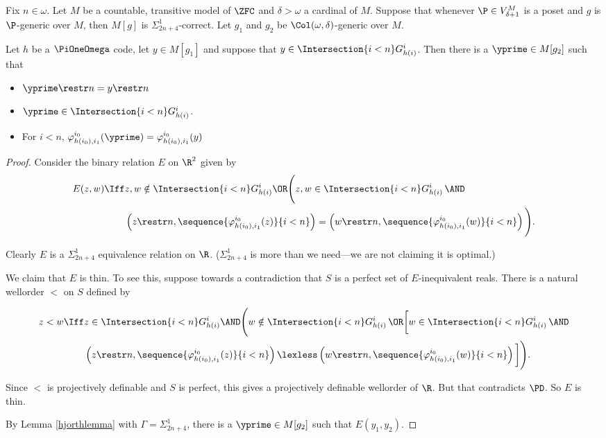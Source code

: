 \documentclass[oneside,12pt]{amsart}
\begin{document}
\begin{corollary}
\label{hjorthcorollary} Fix $n\in\omega$.
Let $M$ be a countable, transitive model of $\ZFC$ and  $\delta>\omega$ a cardinal of $M$.
Suppose that whenever $\P\in V^M_{\delta+1}$ is a poset and $g$ is $\P$-generic over $M$, then
$M[g]$ is $\Sigma^1_{2n+4}$-correct. Let $g_1$ and $g_2$ be $\Col(\omega, \delta)$-generic over $M$.

Let $h$ be a $\PiOneOmega$ code, let $y\in M[g_1]$ and suppose that $y\in \Intersection{i<n} G^i_{h(i)}$. Then there is
a $\yprime \in M[g_2]$ such that
\begin{itemize}
\item $\yprime \restr n = y \restr n$
\item $\yprime\in \Intersection{i<n} G^i_{h(i)}$.
\item For $i<n$, $\varphi^{i_0}_{h(i_0),i_1}(\yprime) = \varphi^{i_0}_{h(i_0),i_1}(y)$
\end{itemize}
\end{corollary}
\begin{proof}
Consider the binary relation $E$ on $\R^2$ given by
\begin{align*}
E(z,w) \Iff &z,w\notin \Intersection{i<n} G^i_{h(i)} \OR \Bigg( z,w \in \Intersection{i<n} G^i_{h(i)} \, \AND  \\
&\left( z\restr n, \sequence{\varphi^{i_0}_{h(i_0),i_1}(z)}{i<n}\right) = \left( w\restr n, \sequence{\varphi^{i_0}_{h(i_0),i_1}(w)}{i<n}\right) \Bigg).
\end{align*}

Clearly $E$ is a $\Sigma^1_{2n+4}$ equivalence relation on $\R$. ($\Sigma^1_{2n+4}$ is more than we
need---we are not claiming it is optimal.)

We claim that $E$ is thin. To see this, suppose towards a contradiction that $S$ is a perfect set of $E$-inequivalent reals.
There is a natural wellorder $<$ on $S$ defined by

\begin{align*}
z<w \Iff &z\in \Intersection{i<n} G^i_{h(i)} \AND \Bigg( w \notin \Intersection{i<n} G^i_{h(i)} \, \OR   \bigg[w \in \Intersection{i<n} G^i_{h(i)} \, \AND\\
&\left( z\restr n, \sequence{\varphi^{i_0}_{h(i_0),i_1}(z)}{i<n}\right) \lexless \left( w\restr n, \sequence{\varphi^{i_0}_{h(i_0),i_1}(w)}{i<n}\right) \bigg]\Bigg).
\end{align*}

Since $<$ is projectively definable and $S$ is perfect, this gives a projectively definable wellorder of $\R$. But that
contradicts $\PD$. So $E$ is thin.

By Lemma \ref{hjorthlemma} with $\Gamma=\Sigma^1_{2n+4}$, there is a
$\yprime\in M[g_2]$ such that $E(y_1, y_2)$.
\end{proof}
\end{document}

